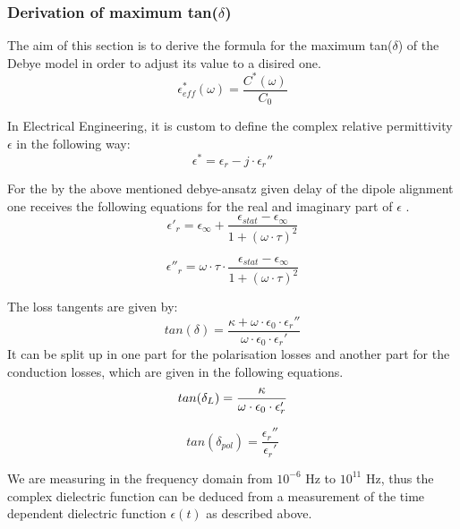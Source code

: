 \subsubsection{Derivation of maximum tan($\delta$)}
The aim of this section is to derive the formula for the maximum tan($\delta$) of the Debye model in order to adjust its value to a disired one.
\begin{equation}
\epsilon_{eff}^* (\omega) = \frac{C^*(\omega)}{C_0}
\end{equation}

In Electrical Engineering, it is custom to define the  complex relative permittivity $\epsilon$ in the following way: 
\begin{equation}
\epsilon^* = \epsilon_r-j \cdot \epsilon_r''
\end{equation}

For the by the above mentioned debye-ansatz given delay of the dipole alignment one receives the following equations for the real and imaginary part of $\epsilon$ \cite{Kuchler}. 
\begin{equation}
\epsilon'_r = \epsilon_{\infty} + \frac{\epsilon_{stat}-\epsilon_{\infty}}{1+(\omega \cdot \tau )^2}
\end{equation}

\begin{equation}
\epsilon''_r = \omega \cdot \tau \cdot \frac{\epsilon_{stat}-\epsilon_{\infty}}{1+(\omega \cdot \tau )^2}
\end{equation}

The loss tangents are given by:
\begin{equation}
tan (\delta) = \frac{\kappa + \omega \cdot \epsilon_0 \cdot \epsilon _r ''}{\omega \cdot \epsilon_0 \cdot \epsilon _r '}
\end{equation}
It can be split up in one part for the polarisation losses and another part for the conduction losses, which are given in the following equations. 
\begin{equation}
tan (\delta_{L}) = \frac{\kappa}{\omega \cdot \epsilon_0 \cdot \epsilon_r'} \newline
\end{equation}

\begin{equation}
tan (\delta_{pol}) = \frac {\epsilon_r'' } {\epsilon_r'}
\end{equation}


We are measuring in the frequency domain from $10^{-6}$ Hz to $10^{11}$ Hz, thus the complex dielectric function can be deduced from a measurement of the time dependent dielectric function $\epsilon(t)$ as described above. 

